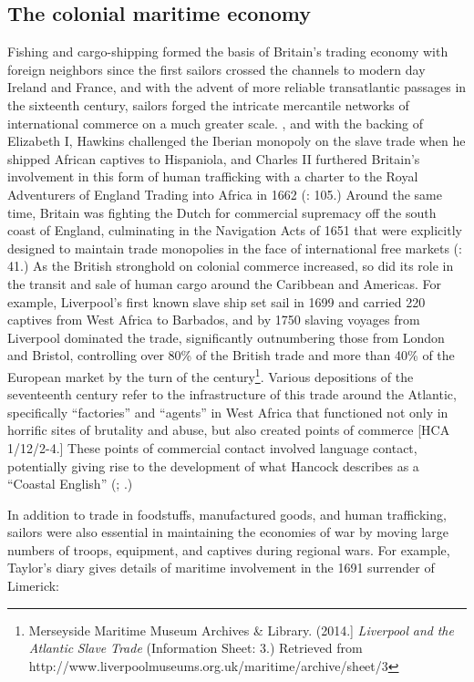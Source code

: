 \subsection{\textbf{The} \textbf{colonial} \textbf{maritime} \textbf{economy}}%

  Fishing and cargo-shipping formed the basis of Britain’s trading economy with foreign neighbors since the first sailors crossed the channels to modern day Ireland and France, and with the advent of more reliable transatlantic passages in the sixteenth century, sailors forged the intricate mercantile networks of international commerce on a much greater scale. \citealt{In1562}, and with the backing of Elizabeth I, Hawkins challenged the Iberian monopoly on the slave trade when he shipped African captives to Hispaniola, and Charles II furthered Britain’s involvement in this form of human trafficking with a charter to the Royal Adventurers of England Trading into Africa in 1662 (\citealt{Brown2011}: 105.) Around the same time, Britain was fighting the Dutch for commercial supremacy off the south coast of England, culminating in the Navigation Acts of 1651 that were explicitly designed to maintain trade monopolies in the face of international free markets (\citealt{Brown2011}: 41.) As the British stronghold on colonial commerce increased, so did its role in the transit and sale of human cargo around the Caribbean and Americas. For example, Liverpool’s first known slave ship set sail in 1699 and carried 220 captives from West Africa to Barbados, and by 1750 slaving voyages from Liverpool dominated the trade, significantly outnumbering those from London and Bristol, controlling over 80\% of the British trade and more than 40\% of the European market by the turn of the century\footnote{Merseyside Maritime Museum Archives \& Library. (2014.] \textit{Liverpool} \textit{and} \textit{the} \textit{Atlantic} \textit{Slave} \textit{Trade} (Information Sheet: 3.) Retrieved from http://www.liverpoolmuseums.org.uk/maritime/archive/sheet/3}. Various depositions of the seventeenth century refer to the infrastructure of this trade around the Atlantic, specifically “factories” and “agents” in West Africa that functioned not only in horrific sites of brutality and abuse, but also created points of commerce [HCA 1/12/2-4.] These points of commercial contact involved language contact, potentially giving rise to the development of what Hancock describes as a “Coastal English” (\citealt{Hancock1986}; \citealt{DelgadoHancock2017}.)

In addition to trade in foodstuffs, manufactured goods, and human trafficking, sailors were also essential in maintaining the economies of war by moving large numbers of troops, equipment, and captives during regional wars. For example, Taylor’s diary gives details of maritime involvement in the 1691 surrender of Limerick:

